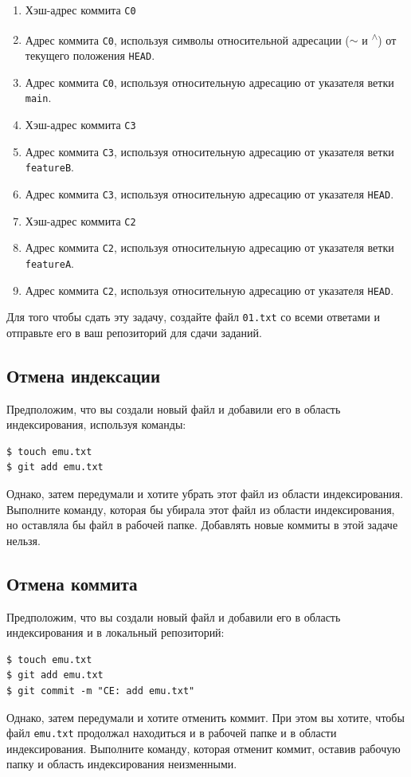 \documentclass{article}
\begin{document}
\begin{enumerate}
\item Хэш-адрес коммита \texttt{C0}
\item Адрес коммита \texttt{C0}, используя символы относительной адресации (\texttt{$\sim$} и \texttt{\textsuperscript{$\wedge$}}) от текущего положения \texttt{HEAD}.
\item Адрес коммита \texttt{C0}, используя относительную адресацию от указателя ветки \texttt{main}.
\item Хэш-адрес коммита \texttt{C3}
\item Адрес коммита \texttt{C3}, используя относительную адресацию от указателя ветки \texttt{featureB}.
\item Адрес коммита \texttt{C3}, используя относительную адресацию от указателя \texttt{HEAD}.
\item Хэш-адрес коммита \texttt{C2}
\item Адрес коммита \texttt{C2}, используя относительную адресацию от указателя ветки \texttt{featureA}.
\item Адрес коммита \texttt{C2}, используя относительную адресацию от указателя \texttt{HEAD}.
\end{enumerate}
Для того чтобы сдать эту задачу, создайте файл \texttt{01.txt} со всеми ответами и отправьте его в ваш репозиторий для сдачи заданий.

\subsection{Отмена индексации}
Предположим, что вы создали новый файл и добавили его в область индексирования, используя команды:
\begin{lstlisting}[style=csMiptBash]
$ touch emu.txt
$ git add emu.txt
\end{lstlisting}
Однако, затем передумали и хотите убрать этот файл из области индексирования.
Выполните команду, которая бы убирала этот файл из области индексирования, но оставляла бы файл в рабочей папке. Добавлять новые коммиты в этой задаче нельзя.

\subsection{Отмена коммита}
Предположим, что вы создали новый файл и добавили его в область индексирования и в локальный репозиторий:
\begin{lstlisting}[style=csMiptBash]
$ touch emu.txt
$ git add emu.txt
$ git commit -m "CE: add emu.txt"
\end{lstlisting}
Однако, затем передумали и хотите отменить коммит. При этом вы хотите, чтобы файл \texttt{emu.txt} продолжал находиться и в рабочей папке и в области индексирования. Выполните команду, которая отменит коммит, оставив рабочую папку и область индексирования неизменными.
\end{document}

